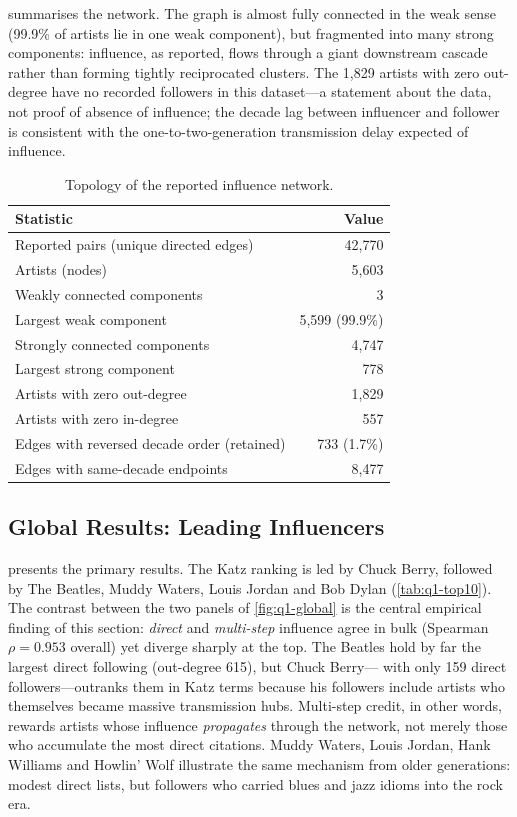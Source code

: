  summarises the network. The graph is almost fully
connected in the weak sense (99.9\% of artists lie in one weak component),
but fragmented into many strong components: influence, as reported, flows
through a giant downstream cascade rather than forming tightly reciprocated
clusters. The 1{,}829 artists with zero out-degree have no recorded
followers in this dataset---a statement about the data, not proof of
absence of influence; the decade lag between influencer and follower is
consistent with the one-to-two-generation transmission delay expected of
influence.

\begin{table}[htbp]
\centering
\caption{Topology of the reported influence network.}
\label{tab:q1-topology}
\begin{tabular}{lr}
\toprule
Statistic & Value \\
\midrule
Reported pairs (unique directed edges) & 42{,}770 \\
Artists (nodes) & 5{,}603 \\
Weakly connected components & 3 \\
Largest weak component & 5{,}599 (99.9\%) \\
Strongly connected components & 4{,}747 \\
Largest strong component & 778 \\
Artists with zero out-degree & 1{,}829 \\
Artists with zero in-degree & 557 \\
Edges with reversed decade order (retained) & 733 (1.7\%) \\
Edges with same-decade endpoints & 8{,}477 \\
\bottomrule
\end{tabular}
\end{table}

\subsection{Global Results: Leading Influencers}\label{subsec:q1-global}

 presents the primary results. The Katz ranking is led by
Chuck Berry, followed by The Beatles, Muddy Waters, Louis Jordan and Bob
Dylan (\cref{tab:q1-top10}). The contrast between the two panels of
\cref{fig:q1-global} is the central empirical finding of this section:
\emph{direct} and \emph{multi-step} influence agree in bulk
(Spearman \(\rho=0.953\) overall) yet diverge sharply at the top. The Beatles
hold by far the largest direct following (out-degree 615), but Chuck Berry---
with only 159 direct followers---outranks them in Katz terms because his
followers include artists who themselves became massive transmission hubs.
Multi-step credit, in other words, rewards artists whose influence
\emph{propagates} through the network, not merely those who accumulate the
most direct citations. Muddy Waters, Louis Jordan, Hank Williams and Howlin'
Wolf illustrate the same mechanism from older generations: modest direct
lists, but followers who carried blues and jazz idioms into the rock era.

